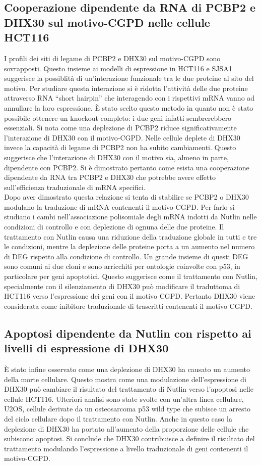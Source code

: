   \subsection{Cooperazione dipendente da RNA di PCBP2 e DHX30 sul motivo-CGPD nelle cellule HCT116}
  I profili dei siti di legame di PCBP2 e DHX30 sul motivo-CGPD sono sovrapposti.
  Questo insieme ai modelli di espressione in HCT116 e SJSA1 suggerisce la possiblit\`a di un'interazione funzionale tra le due proteine al sito del motivo.
  Per studiare questa interazione si \`e ridotta l'attivit\`a delle due proteine attraverso RNA ``short hairpin'' che interagendo con i rispettivi mRNA vanno ad annullare la loro espressione.
  \`E stato scelto questo metodo in quanto non \`e stato possibile ottenere un knockout completo: i due geni infatti sembrerebbero essenziali.
  Si nota come una deplezione di PCBP2 riduce significativamente l'interazione di DHX30 con il motivo-CGPD.
  Nelle cellule deplete di DHX30 invece la capacit\`a di legame di PCBP2 non ha subito cambiamenti.
  Questo suggerisce che l'interazione di DHX30 con il motivo sia, almeno in parte, dipendente con PCBP2.
  Si \`e dimostrato pertanto come esista una cooperazione dipendente da RNA tra PCBP2 e DHX30 che potrebbe avere effetto sull'efficienza traduzionale di mRNA specifici.\\
  Dopo aver dimostrato questa relazione si tenta di stabilire se PCBP2 o DHX30 modulano la traduzione di mRNA contenenti il motivo-CGPD.
  Per farlo si studiano i cambi nell'associazione polisomiale degli mRNA indotti da Nutlin nelle condizioni di controllo e con deplezione di ognuna delle due proteine.
  Il trattamento con Nutlin causa una riduzione della traduzione globale in tutti e tre le condizioni, mentre la deplezione delle proteine porta a un aumento nel numero di DEG rispetto alla condizione di controllo.
  Un grande insieme di questi DEG sono comuni ai due cloni e sono arricchiti per ontologie coinvolte con p53, in particolare per geni apoptotici.
  Questo suggerisce come il trattamento con Nutlin, specialmente con il silenziamento di DHX30 pu\`o modificare il traduttoma di HCT116 verso l'espressione dei geni con il motivo CGPD.
  Pertanto DHX30 viene considerata come inibitore traduzionale di trascritti contenenti il motivo CGPD.

  \subsection{Apoptosi dipendente da Nutlin con rispetto ai livelli di espressione di DHX30}
  \`E stato infine osservato come una deplezione di DHX30 ha causato un aumento della morte cellulare.
  Questo mostra come una modulazione dell'espressione di DHX30 pu\`o cambiare il risultato del trattamento di Nutlin verso l'apoptosi nelle cellule HCT116.
  Ulteriori analisi sono state svolte con un'altra linea cellulare, U2OS, cellule derivate da un osteosarcoma p53 wild type che subisce un arresto del ciclo cellulare dopo il trattamento con Nutlin.
  Anche in questo caso la deplezione di DHX30 ha portato all'aumento della proporzione delle cellule che subiscono apoptosi.
  Si conclude che DHX30 contribuisce a definire il risultato del trattamento modulando l'espressione a livello traduzionale di geni contenenti il motivo-CGPD.

